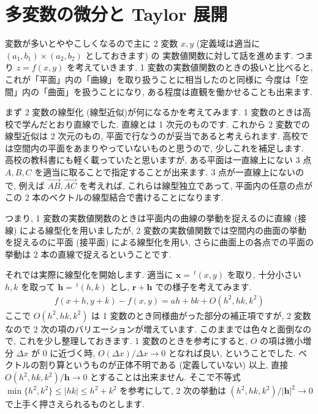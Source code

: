 \documentclass[openany, a4paper, oneside]{jsbook}
\theoremstyle{break}
\theoremstyle{breakdefn}
\begin{document}
\section{多変数の微分と Taylor 展開}


変数が多いとややこしくなるので主に 2 変数 $x,y$ (定義域は適当に $(a_1,b_1)\times (a_2,b_2)$ としておきます) の
実数値関数に対して話を進めます.
つまり $z=f (x,y)$ を考えていきます.
1 変数の実数値関数のときの扱いと比べると, これが「平面」内の「曲線」を取り扱うことに相当したのと同様に
今度は「空間」内の「曲面」を扱うことになり, ある程度は直観を働かせることも出来ます.

まず 2 変数の線型化 (線型近似)が何になるかを考えてみます.
1 変数のときは高校で学んだとおり直線でした.
直線とは 1 次元のものです.
これから 2 変数での線型近似は 2 次元のもの, 平面で行なうのが妥当であると考えられます.
高校では空間内の平面をあまりやっていないものと思うので, 少しこれを補足します.
高校の教科書にも軽く載っていたと思いますが, ある平面は一直線上にない 3 点 $A,B,C$ を適当に取ることで指定することが出来ます.
3 点が一直線上にないので, 例えば $\overrightarrow{AB},\overrightarrow{AC}$ を考えれば, これらは線型独立であって, 平面内の任意の点が
この 2 本のベクトルの線型結合で書けることになります.

つまり, 1 変数の実数値関数のときは平面内の曲線の挙動を捉えるのに直線 (接線) による線型化を用いましたが,
2 変数の実数値関数では空間内の曲面の挙動を捉えるのに平面 (接平面) による線型化を用い,
さらに曲面上の各点での平面の挙動は 2 本の直線で捉えるということです.

それでは実際に線型化を開始します.
適当に $\bm{x}=\,^t (x,y)$ を取り, 十分小さい $h,k$ を取って $\bm{h}=\,^t (h,k)$ とし,
 $\bm{r}+\bm{h}$ での様子を考えてみます.
    \begin{align}
        f (x+h,y+k) - f (x,y)
        =
        ah + bk + O (h^2,h k,k^2)
    \end{align}
ここで $O (h^2,h k,k^2)$ は 1 変数のとき同様曲がった部分の補正項ですが, 2 変数なので 2 次の項のバリエーションが増えています.
このままでは色々と面倒なので, これを少し整理しておきます.
1 変数のときを参考にすると,  $O$ の項は微小増分 $\Delta x$ が 0 に近づく時,  $O (\Delta x)/\Delta x \to 0$ となれば良い, ということでした.
ベクトルの割り算というものが正体不明である (定義していない) 以上, 直接 $O (h^2,h k,k^2)/\bm{h}\to0$ とすることは出来ません.
そこで不等式 $\min \{ h^2,k^2  \} \leq |h k|\leq h^2 + k^2$ を参考にして, 2 次の挙動は
 $(h^2,h k,k^2)/|\bm{h}|^2\to0$ で上手く押さえられるものとします.
\end{document}
